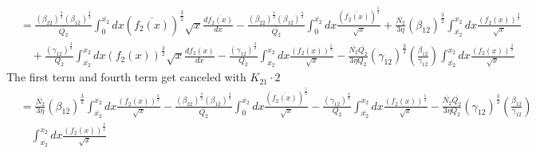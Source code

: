 \documentclass[fleqn, 10pt]{article}
\begin{document}
            \begin{equation*}
            \begin{split}
            &= \frac{(\beta_{2\overline{2}})^\frac{3}{2} (\beta_{1\overline{2}})^\frac{3}{2}}{\overline{Q_2}} \int^{\overline{x_2}}_0 dx (\overline{f_2(x)})^\frac{3}{2} \sqrt{x} \frac{d\overline{f_2(x)}}{dx} - \frac{(\beta_{2\overline{2}})^\frac{3}{2} (\beta_{1\overline{2}})^\frac{3}{2}}{\overline{Q_2}} \int^{\overline{x_2}}_0 dx \frac{(\overline{f_2(x)})^\frac{5}{2}}{\sqrt{x}} + \frac{\overline{N_2}}{3 \eta} (\beta_{1\overline{2}})^\frac{3}{2} \int^{x_2}_{\overline{x_2}} dx \frac{(f_2(x))^\frac{3}{2}}{\sqrt{x}} \\ & \quad + \frac{(\gamma_{12})^\frac{3}{2}}{Q_2} \int^{x_2}_{\overline{x_2}} dx (f_2(x))^\frac{3}{2} \sqrt{x} \frac{df_2(x)}{dx} - \frac{(\gamma_{12})^\frac{3}{2}}{Q_2} \int^{x_2}_{\overline{x_2}} dx \frac{(f_2(x))^\frac{5}{2}}{\sqrt{x}} - \frac{\overline{N_2} \overline{Q_2}}{3 \eta Q_2} (\gamma_{12})^\frac{3}{2} \left(\frac{\beta_{1\overline{2}}}{\gamma_{12}}\right) \int^{x_2}_{\overline{x_2}} dx \frac{(f_2(x))^\frac{3}{2}}{\sqrt{x}}
            \end{split}
            \end{equation*}
            The first term and fourth term get canceled with $K_{21} \cdot 2$
            \begin{equation*}
            \begin{split}
            &= \frac{\overline{N_2}}{3 \eta} (\beta_{1\overline{2}})^\frac{3}{2} \int^{x_2}_{\overline{x_2}} dx \frac{(f_2(x))^\frac{3}{2}}{\sqrt{x}} - \frac{(\beta_{2\overline{2}})^\frac{3}{2} (\beta_{1\overline{2}})^\frac{3}{2}}{\overline{Q_2}} \int^{\overline{x_2}}_0 dx \frac{(\overline{f_2(x)})^\frac{5}{2}}{\sqrt{x}} - \frac{(\gamma_{12})^\frac{3}{2}}{Q_2} \int^{x_2}_{\overline{x_2}} dx \frac{(f_2(x))^\frac{5}{2}}{\sqrt{x}} - \frac{\overline{N_2} \overline{Q_2}}{3 \eta Q_2} (\gamma_{12})^\frac{3}{2} \left(\frac{\beta_{1\overline{2}}}{\gamma_{12}}\right)  \\ & \quad \int^{x_2}_{\overline{x_2}} dx \frac{(f_2(x))^\frac{3}{2}}{\sqrt{x}}
            \end{split}
            \end{equation*}
\end{document}
